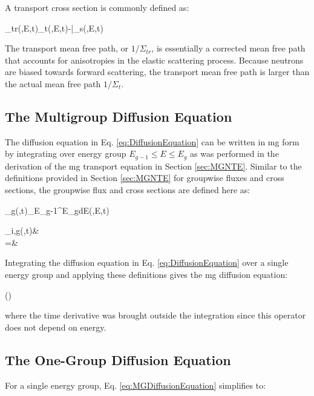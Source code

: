 A transport cross section is commonly defined as:

\beq
\label{eq:TransportSigma}
\Sigma_{tr}(,E,t)\equiv\Sigma_t(,E,t)-\bar{\mu}\Sigma_s(,E,t)
\eeq

The transport mean free path, or \(1/\Sigma_{tr}\), is essentially a corrected mean free path that accounts for anisotropies in the elastic scattering process. Because neutrons are biased towards forward scattering, the transport mean free path is larger than the actual mean free path \(1/\Sigma_t\). 

\subsection{The Multigroup Diffusion Equation}

The diffusion equation in Eq. \eqref{eq:DiffusionEquation} can be written in \gls{mg} form by integrating over energy group \(E_{g-1}\leq E\leq E_g\) as was performed in the derivation of the \gls{mg} transport equation in Section \ref{sec:MGNTE}. Similar to the definitions provided in Section \ref{sec:MGNTE} for groupwise fluxes and cross sections, the groupwise flux and cross sections are defined here as:

\beq
\phi_g(,t)\equiv\int_{E_{g-1}}^{E_g}dE\phi(,E,t)
\eeq

\beqa
\Sigma_{i,g}(,t)\equiv&\\
=&\\
\eeqa

Integrating the diffusion equation in Eq. \eqref{eq:DiffusionEquation} over a single energy group and applying these definitions gives the \gls{mg} diffusion equation:

\beqa
\label{eq:MGDiffusionEquation}
\left(\right) %
\eeqa

where the time derivative was brought outside the integration since this operator does not depend on energy. 

\subsection{The One-Group Diffusion Equation}
For a single energy group, Eq. \eqref{eq:MGDiffusionEquation} simplifies to:

